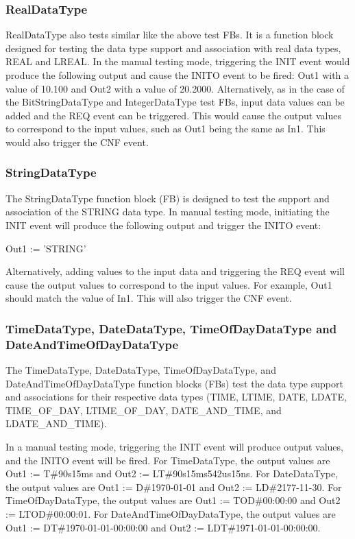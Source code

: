\documentclass[conference]{IEEEtran}
\begin{document}
\subsubsection{RealDataType}

RealDataType also tests similar like the above test FBs.
It is a function block designed for testing the data type support and association with real data types, REAL and LREAL. In the manual testing mode, triggering the INIT event would produce the following output and cause the INITO event to be fired: Out1 with a value of 10.100 and Out2 with a value of 20.2000. Alternatively, as in the case of the BitStringDataType and IntegerDataType test FBs, input data values can be added and the REQ event can be triggered. This would cause the output values to correspond to the input values, such as Out1 being the same as In1. This would also trigger the CNF event.

\subsubsection{StringDataType}

The StringDataType function block (FB) is designed to test the support and association of the STRING data type. In manual testing mode, initiating the INIT event will produce the following output and trigger the INITO event:

Out1 := 'STRING'

Alternatively, adding values to the input data and triggering the REQ event will cause the output values to correspond to the input values. For example, Out1 should match the value of In1. This will also trigger the CNF event.
\break
\subsubsection{TimeDataType, DateDataType, TimeOfDayDataType and DateAndTimeOfDayDataType}

The TimeDataType, DateDataType, TimeOfDayDataType, and DateAndTimeOfDayDataType function blocks (FBs) test the data type support and associations for their respective data types (TIME, LTIME, DATE, LDATE, TIME\_OF\_DAY, LTIME\_OF\_DAY, DATE\_AND\_TIME, and LDATE\_AND\_TIME).

In a manual testing mode, triggering the INIT event will produce output values, and the INITO event will be fired. For TimeDataType, the output values are Out1 := T\#90s15ms and Out2 := LT\#90s15ms542us15ns. For DateDataType, the output values are Out1 := D\#1970-01-01 and Out2 := LD\#2177-11-30. For TimeOfDayDataType, the output values are Out1 := TOD\#00:00:00 and Out2 := LTOD\#00:00:01. For DateAndTimeOfDayDataType, the output values are Out1 := DT\#1970-01-01-00:00:00 and Out2 := LDT\#1971-01-01-00:00:00.
\end{document}

